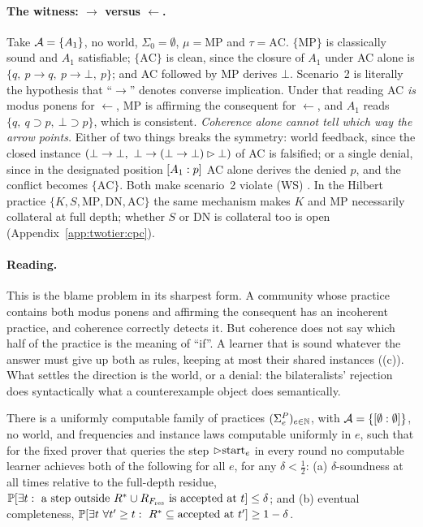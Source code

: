 \paragraph{The witness: $\to$ versus $\leftarrow$.} Take $\mathcal{A}=\{A_1\}$, no world, $\Sigma_0=\emptyset$, $\mu=\mathrm{MP}$ and $\tau=\mathrm{AC}$. $\{\mathrm{MP}\}$ is classically sound and $A_1$ satisfiable; $\{\mathrm{AC}\}$ is clean, since the closure of $A_1$ under AC alone is $\{q,\ p\to q,\ p\to\bot,\ p\}$; and AC followed by MP derives $\bot$. Scenario~2 is literally the hypothesis that ``$\to$'' denotes converse implication. Under that reading AC \emph{is} modus ponens for $\leftarrow$, MP is affirming the consequent for $\leftarrow$, and $A_1$ reads $\{q,\ q\supset p,\ \bot\supset p\}$, which is consistent. \emph{Coherence alone cannot tell which way the arrow points.} Either of two things breaks the symmetry: world feedback, since the closed instance $(\bot\to\bot,\ \bot\to(\bot\to\bot)\step\bot)$ of AC is falsified; or a single denial, since in the designated position $[A_1 : p]$ AC alone derives the denied $p$, and the conflict becomes $\{\mathrm{AC}\}$. Both make scenario~2 violate (WS) . In the Hilbert practice $\{K,S,\mathrm{MP},\mathrm{DN},\mathrm{AC}\}$ the same mechanism makes $K$ and MP necessarily collateral at full depth; whether $S$ or DN is collateral too is open (Appendix~\ref{app:twotier:cpc}).

\paragraph{Reading.} This is the blame problem in its sharpest form. A community whose practice contains both modus ponens and affirming the consequent has an incoherent practice, and coherence correctly detects it. But coherence does not say which half of the practice is the meaning of ``if''. A learner that is sound whatever the answer must give up both as rules, keeping at most their shared instances ((c)). What settles the direction is the world, or a denial: the bilateralists' rejection \citep{smiley1996rejection,rumfitt2000yes,restall2005multiple} does syntactically what a counterexample object does semantically.

\begin{theorem}\label{thm:twotier:depth}
There is a uniformly computable family of practices $(\Sigma^P_e)_{e\in\mathbb{N}}$, with $\mathcal{A}=\{[\emptyset : \emptyset]\}$, no world, and frequencies and instance laws computable uniformly in $e$, such that for the fixed prover that queries the step $\rhd\mathrm{start}_e$ in every round no computable learner achieves both of the following for all $e$, for any $\delta<\frac12$:
\textup{(a)} $\delta$-soundness at all times relative to the full-depth residue, $\mathbb{P}[\exists t:\text{ a step outside }R^{*}\cup R_{F_{\mathrm{res}}}\text{ is accepted at }t]\le\delta$; and
\textup{(b)} eventual completeness, $\Prob[\exists t\ \forall t'\ge t:\ \Rstar\subseteq\text{accepted at }t']\ge1-\delta$.
\end{theorem}

